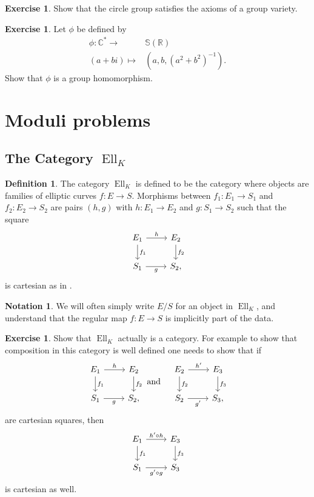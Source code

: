 \documentclass[a4paper,12pt,reqno]{amsart}
\newcommand{\field}[1]{\mathbb{#1}}  %
\newcommand{\R}{\field{R}} %
\newcommand{\C}{\field{C}} %
\renewcommand{\SS}{\field{S}}
\DeclareMathOperator{\Ell}{Ell}
\theoremstyle{definition}
\newtheorem{definition}[lemma]{Definition}
\newtheorem{exercise}[lemma]{Exercise}
\newtheorem{notation}[lemma]{Notation}
\numberwithin{lemma}{section}
\numberwithin{equation}{section}
\numberwithin{figure}{section}
\begin{document}
\begin{exercise}
	Show that the circle group satisfies the axioms of a group variety.
\end{exercise}
\begin{exercise}
Let $\phi$ be defined by 
\begin{align*}
  \phi:\C^* \to& \SS(\R) \\
         (a+bi) \mapsto& (a,b,(a^2+b^2)^{-1}).
\end{align*}
Show that $\phi$ is a group homomorphism.
\end{exercise}


\section{Moduli problems}

\subsection{The Category $\Ell_K$ }

\begin{definition}\label{def:category-ell} The category  \textit{$\Ell_K$} is defined to be the category where objects are families of elliptic curves $f : E  \to S$. Morphisms between $f_1 : E_1  \to S_1$ and $f_2 : E_2  \to S_2$ are pairs $(h,g)$ with $h : E_1 \to E_2$ and $g: S_1 \to S_2$ such that the square 
	\[
	\begin{tikzcd}
	E_1 \arrow[r,"h"] \arrow[d,"f_1"] & E_2 \arrow[d, "f_2"] \\
	S_1 \arrow[r, "g"'] & S_2,
	\end{tikzcd}
	\]  is cartesian as in .
\end{definition}

\begin{notation}
We will often simply write $E/S$ for an object in $\Ell_K$, and understand that the regular map $f: E \to S$ is implicitly part of the data.
\end{notation}

\begin{exercise}
Show that $\Ell_K$ actually is a category. For example to show that composition in this category is well defined one needs to show that if
\[
\begin{tabular}{cc}	
\begin{tikzcd}
E_1 \arrow[r,"h"] \arrow[d,"f_1"] & E_2 \arrow[d, "f_2"] \\
S_1 \arrow[r, "g"'] & S_2,
\end{tikzcd} and
&
\begin{tikzcd}
E_2 \arrow[r,"h'"] \arrow[d,"f_2"] & E_3 \arrow[d, "f_3"] \\
S_2 \arrow[r, "g'"'] & S_3,
\end{tikzcd}
\end{tabular}
\]
are cartesian squares, then 
\[\begin{tikzcd}
E_1 \arrow[r,"h' \circ h"] \arrow[d,"f_1"] & E_3 \arrow[d, "f_3"] \\
S_1 \arrow[r, "g' \circ g"'] & S_3
\end{tikzcd}
\] is cartesian as well.
\end{exercise}
\end{document}
